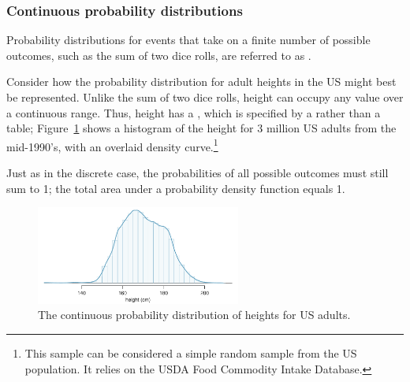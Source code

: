 \subsubsection{Continuous probability distributions}
\label{contDist}


Probability distributions for events that take on a finite number of possible outcomes, such as the sum of two dice rolls, are referred to as . 

Consider how the probability distribution for adult heights in the US might best be represented. Unlike the sum of two dice rolls, height can occupy any value over a continuous range. Thus, height has a , which is specified by a  rather than a table; Figure~\ref{fdicHeightContDist} shows a histogram of the height for 3 million US adults from the mid-1990's, with an overlaid density curve.\footnote{This sample can be considered a simple random sample from the US population. It relies on the USDA Food Commodity Intake Database.} 

Just as in the discrete case, the probabilities of all possible outcomes must still sum to 1; the total area under a probability density function equals 1. 

\begin{figure}[h!]
	\centering
	\includegraphics[width=0.60\textwidth]{ch_probability_oi_biostat/figures/fdicHeightContDist/fdicHeightContDist}
	\caption{The continuous probability distribution of heights for US adults.}
	\label{fdicHeightContDist}	
\end{figure}

